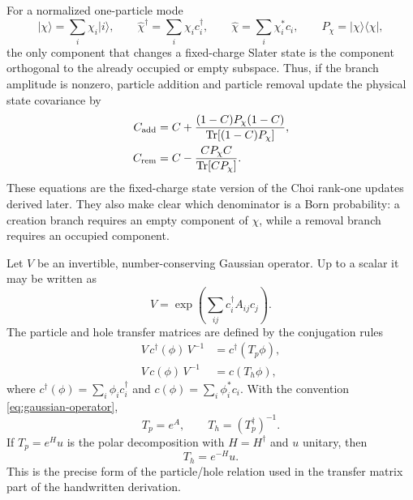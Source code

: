 \documentclass[aps,prb,onecolumn,nofootinbib,superscriptaddress]{revtex4-2}
\newcommand{\Tr}{\operatorname{Tr}}
\newcommand{\ket}[1]{\lvert #1\rangle}
\newcommand{\bra}[1]{\langle #1\rvert}
\theoremstyle{plain}
\theoremstyle{definition}
\begin{document}
For a normalized one-particle mode
\begin{equation}
  \ket{\chi}=\sum_i\chi_i\ket{i},
  \qquad
  \hat\chi^\dagger=\sum_i\chi_i c_i^\dagger,
  \qquad
  \hat\chi=\sum_i\chi_i^*c_i,
  \qquad
  P_\chi=\ket{\chi}\bra{\chi},
  \label{eq:chi-mode}
\end{equation}
the only component that changes a fixed-charge Slater state is the component
orthogonal to the already occupied or empty subspace.  Thus, if the branch
amplitude is nonzero, particle addition and particle removal update the
physical state covariance by
\begin{align}
  C_{\rm add}
  &=
  C+
  \frac{(1-C)P_\chi(1-C)}
       {\Tr[(1-C)P_\chi]},
  \label{eq:state-addition}\\
  C_{\rm rem}
  &=
  C-
  \frac{CP_\chi C}
       {\Tr[CP_\chi]} .
  \label{eq:state-removal}
\end{align}
These equations are the fixed-charge state version of the Choi rank-one
updates derived later.  They also make clear which denominator is a Born
probability: a creation branch requires an empty component of \(\chi\), while
a removal branch requires an occupied component.

Let \(V\) be an invertible, number-conserving Gaussian operator.  Up to a scalar
it may be written as
\begin{equation}
  V=\exp\!\left(\sum_{ij}c_i^\dagger A_{ij}c_j\right).
  \label{eq:gaussian-operator}
\end{equation}
The particle and hole transfer matrices are defined by the conjugation rules
\begin{align}
  V\,c^\dagger(\phi)\,V^{-1}
  &=
  c^\dagger(T_p\phi),
  \label{eq:Tp-def}\\
  V\,c(\phi)\,V^{-1}
  &=
  c(T_h\phi),
  \label{eq:Th-def}
\end{align}
where \(c^\dagger(\phi)=\sum_i\phi_i c_i^\dagger\) and
\(c(\phi)=\sum_i\phi_i^*c_i\).  With the convention
\eqref{eq:gaussian-operator},
\begin{equation}
  T_p=e^A,
  \qquad
  T_h=(T_p^\dagger)^{-1}.
  \label{eq:Tp-Th-relation}
\end{equation}
If \(T_p=e^H u\) is the polar decomposition with \(H=H^\dagger\) and \(u\)
unitary, then
\begin{equation}
  T_h=e^{-H}u .
  \label{eq:polar-Th}
\end{equation}
This is the precise form of the particle/hole relation used in the transfer
matrix part of the handwritten derivation.
\end{document}
